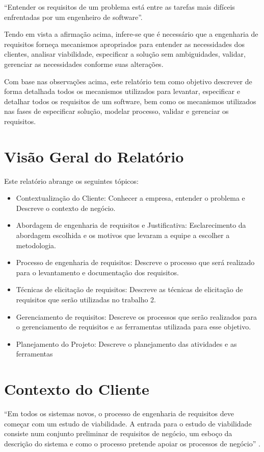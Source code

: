 “Entender os requisitos de um problema está entre as tarefas mais difíceis enfrentadas por um engenheiro de software”.\cite {pressman}

Tendo em vista a afirmação acima, infere-se que é necessário que a engenharia de requisitos forneça mecanismos apropriados para entender as necessidades dos clientes, analisar viabilidade, especificar a solução sem ambiguidades, validar, gerenciar as necessidades conforme suas alterações.

Com base nas observações acima, este relatório tem como objetivo descrever de forma detalhada todos os mecanismos utilizados para levantar, especificar e detalhar todos os requisitos de um software, bem como os mecanismos utilizados nas fases de especificar solução, modelar processo, validar e gerenciar os requisitos.


\section {Visão Geral do Relatório}

Este relatório abrange os seguintes tópicos:

\begin{itemize}
\item Contextualização do Cliente: Conhecer a empresa, entender o problema e Descreve o contexto de negócio.
\item Abordagem de engenharia de requisitos e Justificativa: Esclarecimento da abordagem escolhida e os motivos que levaram a equipe a escolher a metodologia.
\item Processo de engenharia de requisitos: Descreve o processo que será realizado para o levantamento e documentação dos requisitos.
\item Técnicas de elicitação de requisitos: Descreve as técnicas de elicitação de requisitos que serão utilizadas no trabalho 2.
\item Gerenciamento de requisitos: Descreve os processos que serão realizados para o gerenciamento de requisitos e as ferramentas utilizada para esse objetivo.
\item Planejamento do Projeto: Descreve o planejamento das atividades e as ferramentas
\end{itemize}

\section {Contexto do Cliente}

“Em todos os sistemas novos, o processo de engenharia de requisitos deve começar com um estudo de viabilidade. A entrada para o estudo de viabilidade consiste num conjunto preliminar de requisitos de negócio, um esboço da descrição do sistema e como o processo pretende apoiar os processos de negócio” \cite {ian}.

